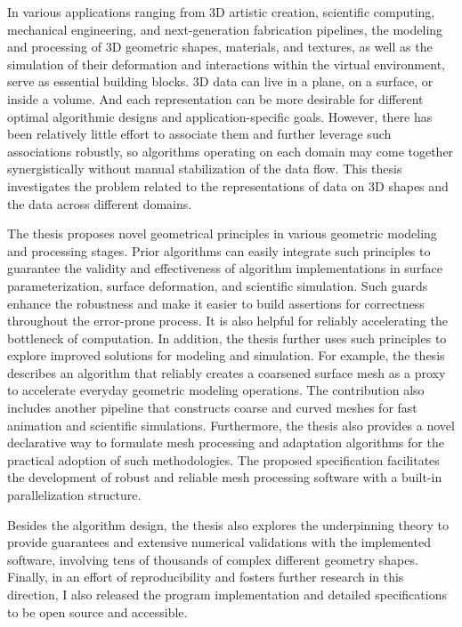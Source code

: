 In various applications ranging from 3D artistic creation, scientific computing, mechanical engineering, and next-generation fabrication pipelines, 
the modeling and processing of 3D geometric shapes, materials, and textures, as well as the simulation of their deformation and interactions within the virtual environment, serve as essential building blocks.
3D data can live in a plane, on a surface, or inside a volume. And each representation can be more desirable for different optimal algorithmic designs and application-specific goals. However, there has been relatively little effort to associate them and further leverage such associations robustly, so algorithms operating on each domain may come together synergistically without manual stabilization of the data flow.
This thesis investigates the problem related to the representations of data on 3D shapes and the data across different domains.

The thesis proposes novel geometrical principles in various geometric modeling and processing stages. Prior algorithms can easily integrate such principles to guarantee the validity and effectiveness of algorithm implementations in surface parameterization, surface deformation, and scientific simulation.
Such guards enhance the robustness and make it easier to build assertions for correctness throughout the error-prone process. It is also helpful for reliably accelerating the bottleneck of computation. 
In addition, the thesis further uses such principles to explore improved solutions for modeling and simulation. 
For example, the thesis describes an algorithm that reliably creates a coarsened surface mesh as a proxy to accelerate everyday geometric modeling operations. The contribution also includes another pipeline that constructs coarse and curved meshes for fast animation and scientific simulations.
Furthermore, the thesis also provides a novel declarative way to formulate mesh processing and adaptation algorithms for the practical adoption of such methodologies. The proposed specification facilitates the development of robust and reliable mesh processing software with a built-in parallelization structure.

Besides the algorithm design, the thesis also explores the underpinning theory to provide guarantees and extensive numerical validations with the implemented software, involving tens of thousands of complex different geometry shapes. Finally, in an effort of reproducibility and fosters further research in this direction, I also released the program implementation and detailed specifications to be open source and accessible.
